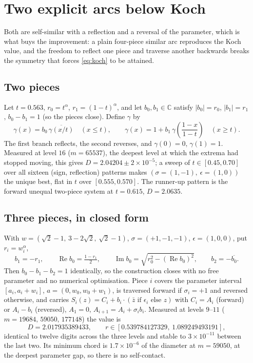 \documentclass[11pt]{article}
\theoremstyle{remark}
\newcommand{\alp}{\alpha}
\begin{document}
\section{Two explicit arcs below Koch}

Both are self-similar with a reflection and a reversal of the parameter, which is what buys the
improvement: a plain four-piece similar arc reproduces the Koch value, and the freedom to reflect
one piece and traverse another backwards breaks the symmetry that forces \eqref{eq:koch} to be
attained.

\subsection*{Two pieces}

Let $t=0.563$, $r_0=t^{\alp}$, $r_1=(1-t)^{\alp}$, and let $b_0,b_1\in\mathbb{C}$ satisfy
$|b_0|=r_0$, $|b_1|=r_1$, $b_0-b_1=1$ (so the pieces close). Define $\gamma$ by
\[
  \gamma(x)=b_0\,\overline{\gamma(x/t)}\quad (x\le t),
  \qquad
  \gamma(x)=1+b_1\,\gamma\!\left(\frac{1-x}{1-t}\right)\quad (x\ge t).
\]
The first branch reflects, the second reverses, and $\gamma(0)=0$, $\gamma(1)=1$.
Measured at level $16$ ($m=65537$), the deepest level at which the extrema had stopped moving,
this gives $D=2.04204\pm2\times10^{-5}$; a sweep of $t\in[0.45,0.70]$ over all sixteen
(sign, reflection) patterns makes $(\sigma=(1,-1),\ \epsilon=(1,0))$ the unique best, flat in $t$
over $[0.555,0.570]$. The runner-up pattern is the forward unequal two-piece system at $t=0.615$,
$D=2.0635$.

\subsection*{Three pieces, in closed form}

With $w=(\sqrt2-1,\ 3-2\sqrt2,\ \sqrt2-1)$, $\sigma=(+1,-1,-1)$, $\epsilon=(1,0,0)$, put
$r_i=w_i^{\alp}$,
\[
  b_1=-r_1,\qquad
  \operatorname{Re}b_0=\tfrac{1-r_1}{2},\qquad
  \operatorname{Im}b_0=\sqrt{r_0^2-(\operatorname{Re}b_0)^2},\qquad
  b_2=-\overline{b_0}.
\]
Then $b_0-b_1-b_2=1$ identically, so the construction closes with no free parameter and no
numerical optimisation. Piece $i$ covers the parameter interval $[a_i,a_i+w_i]$, $a=(0,w_0,w_0+w_1)$,
is traversed forward if $\sigma_i=+1$ and reversed otherwise, and carries
$S_i(z)=C_i+b_i\cdot(\bar z\text{ if }\epsilon_i\text{ else }z)$ with
$C_i=A_i$ (forward) or $A_i-b_i$ (reversed), $A_1=0$, $A_{i+1}=A_i+\sigma_ib_i$.
Measured at levels $9$--$11$ ($m=19684,\,59050,\,177148$) the value is
\[
  D=2.017935389433,\qquad r\in[0.539784127329,\ 1.089249493191],
\]
identical to twelve digits across the three levels and stable to $3\times10^{-11}$ between the
last two. Its minimum chord is $1.7\times10^{-6}$ of the diameter at $m=59050$, at the deepest
parameter gap, so there is no self-contact.
\end{document}
